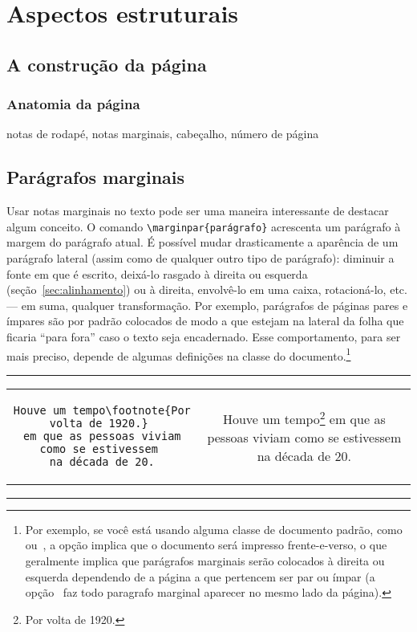 \section{Aspectos estruturais}

\subsection{A construção da página}
\subsubsection{Anatomia da página}

notas de rodapé, notas marginais, cabeçalho, número de página

\subsection{Parágrafos marginais}

Usar  notas
marginais no texto pode ser uma maneira interessante de destacar algum
conceito. O comando \verb'\marginpar{parágrafo}' acrescenta um
parágrafo à margem do parágrafo atual. É possível mudar drasticamente
a aparência de um parágrafo lateral (assim como de qualquer outro tipo
de parágrafo): diminuir a fonte em que é escrito, deixá-lo rasgado à
direita ou esquerda (seção~\ref{sec:alinhamento}) ou à direita,
envolvê-lo em uma caixa,
rotacioná-lo, etc. --- em suma, qualquer
transformação. Por exemplo, parágrafos de páginas pares e ímpares são
por padrão colocados de modo a que estejam na lateral da folha que
ficaria ``para fora'' caso o texto seja encadernado. Esse
comportamento, para ser mais preciso, depende de algumas definições na
classe do documento.\footnote{Por exemplo, se   você está usando
  alguma  classe de documento padrão, como~
  ou~, a opção  implica que o
  documento será impresso frente-e-verso, o que geralmente implica que
  parágrafos marginais serão colocados à direita ou esquerda
  dependendo de a página a que pertencem ser par ou ímpar (a
  opção~ faz todo paragrafo marginal aparecer no
  mesmo lado da página).}

\begin{center}\footnotesize\hrule\smallskip
\begin{tabular}{c|c}
\begin{minipage}{.47\textwidth}
\begin{verbatim}
Houve um tempo\footnote{Por volta de 1920.} 
em que as pessoas viviam como se estivessem 
na década de 20.
\end{verbatim}
\vfill
\end{minipage} &
\begin{minipage}{.47\textwidth}
Houve um tempo\footnote{Por volta de 1920.} em
que as pessoas viviam como se estivessem na 
década de 20.
\vspace*{1cm}
\end{minipage}
\end{tabular}
\smallskip\hrule
\end{center}


